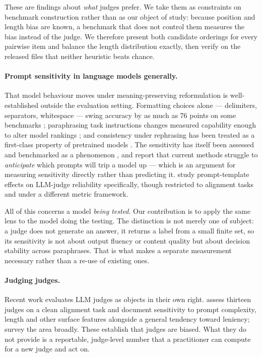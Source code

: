 These are findings about \emph{what} judges prefer. We take them as constraints
on benchmark construction rather than as our object of study: because position
and length bias are known, a benchmark that does not control them measures the
bias instead of the judge. We therefore present both candidate orderings for
every pairwise item and balance the length distribution exactly, then verify on
the released files that neither heuristic beats chance.

\paragraph{Prompt sensitivity in language models generally.}
That model behaviour moves under meaning-preserving reformulation is
well-established outside the evaluation setting. Formatting choices alone ---
delimiters, separators, whitespace --- swing accuracy by as much as 76 points on
some benchmarks \citep{sclar2024quantifying}; paraphrasing task instructions
changes measured capability enough to alter model rankings
\citep{mizrahi2024state}; and consistency under rephrasing has been treated as a
first-class property of pretrained models \citep{elazar2021measuring}. The
sensitivity has itself been assessed and benchmarked as a phenomenon
\citep{zhuo2024prosa, razavi2025benchmarking}, and \citet{razavi2025benchmarking}
report that current methods struggle to \emph{anticipate} which prompts will trip
a model up --- which is an argument for measuring sensitivity directly rather
than predicting it. \citet{wei2024systematic} study prompt-template effects on
LLM-judge reliability specifically, though restricted to alignment tasks and
under a different metric framework.

All of this concerns a model \emph{being tested}. Our contribution is to apply the
same lens to the model doing the testing. The distinction is not merely one of
subject: a judge does not generate an answer, it returns a label from a small
finite set, so its sensitivity is not about output fluency or content quality but
about decision stability across paraphrases. That is what makes a separate
measurement necessary rather than a re-use of existing ones.

\paragraph{Judging judges.}
Recent work evaluates LLM judges as objects in their own right.
\citet{thakur2024judging} assess thirteen judges on a clean alignment task and
document sensitivity to prompt complexity, length and other surface features
alongside a general tendency toward leniency; \citet{li2024llms} survey the area
broadly. These establish that judges are biased. What they do not provide is a
reportable, judge-level number that a practitioner can compute for a new judge
and act on.

